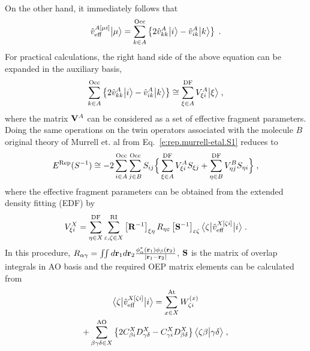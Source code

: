 %
\\ On the other hand, it immediately follows that
%
\begin{equation}
 \hat{v}^{A[\mu i]}_{\rm eff} \Ket{\mu} = 
  \sum_{k\in A}^{\rm Occ} \left\{
     2\hat{v}^A_{kk} \Ket{i} - \hat{v}^A_{ik} \Ket{k}
  \right\} \;.
\end{equation}
%
For practical calculations, the right hand side of the above equation can be expanded 
in the auxiliary basis,
%
\begin{equation} \label{e:v-oep.rep}
  \sum_{k\in A}^{\rm Occ} \left\{
     2\hat{v}^A_{kk} \Ket{i} - \hat{v}^A_{ik} \Ket{k}
  \right\} \cong
  \sum_{\xi\in A}^{\rm DF} 
  V_{\xi i}^A \Ket{\xi} \;,
\end{equation}
%
where the matrix ${\bf V}^A$ can be considered as a set of effective fragment parameters.
Doing the same operations on the twin operators associated with the molecule $B$
original theory of Murrell et. al from Eq.~\eqref{e:rep.murrell-etal.S1}
reduces to
%
\begin{equation} \label{e:rep.murrell-etal.S1.oep}
    E^{\rm Rep}(S^{-1}) \cong 
 -2\sum_{i\in A}^{\rm Occ} \sum_{j\in B}^{\rm Occ}
               S_{ij} \Big\{
           \sum_{\xi \in A}^{\rm DF} V_{\xi i}^A S_{\xi j}
         + \sum_{\eta\in B}^{\rm DF} V_{\eta j}^B S_{\eta i}
                \Big\} \;,
\end{equation}
%
where the
effective fragment parameters
can be obtained 
from the extended density fitting\cite{Blasiak.Bednarska.Choluj.Bartkowiak.JCP.2019} (EDF)
by
%
\begin{equation} \label{e:rep.murrell-etal.S1.oep-edf}
            V_{\xi i}^X = \sum_{\eta\in X}^{\rm DF} 
                          \sum_{\varepsilon,\zeta\in X}^{\rm RI}
                          \left[ {\bf R}^{-1} \right]_{\xi\eta} R_{\eta\varepsilon} 
                          \left[ {\bf S}^{-1} \right]_{\varepsilon\zeta} 
                          \tBraKet{\zeta}{\hat{v}_{\rm eff}^{X[\zeta i]}}{i}
                \;.
\end{equation}
%
In this procedure, $R_{\alpha\gamma}= \iint d{\bf r}_1 d{\bf r}_2 \frac{\phi_{\alpha}^*({\bf r}_1) \phi_{\beta}({\bf r}_2) }{\lvert {\bf r}_1 - {\bf r}_2 \rvert}$, ${\bf S}$ is the matrix of overlap integrals in AO basis
and the required OEP matrix elements can be calculated from
%
\begin{multline} \label{e:rep.murrell-etal.S1.oep-v}
   \tBraKet{\zeta}{\hat{v}_{\rm eff}^{X[\zeta i]}}{i}
     = \sum_{x\in X}^{\rm At} W_{\zeta i}^{(x)} \\
        + \sum_{\beta\gamma\delta\in X}^{\rm AO}
           \left\{ 
             2 C_{\beta i}^X D_{\gamma\delta}^X - C_{\gamma i}^X D_{\beta \delta}^X
           \right\}
           \BraKet{\zeta\beta}{\gamma\delta} \;,
\end{multline}
